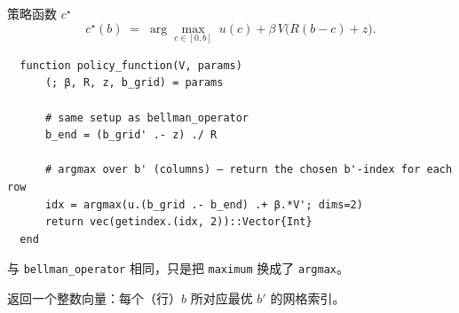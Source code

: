 \documentclass[10pt,aspectratio=169]{beamer}
\begin{document}
\begin{frame}[fragile]{策略函数 $c^\star$}
  \[
    c^\star(b) \;=\; \arg\max_{c \in [0, b]} \; u(c) + \beta \, V\!\big(R(b - c) + z\big).
  \]
  \begin{lstlisting}
  function policy_function(V, params)
      (; β, R, z, b_grid) = params

      # same setup as bellman_operator
      b_end = (b_grid' .- z) ./ R

      # argmax over b' (columns) — return the chosen b'-index for each row
      idx = argmax(u.(b_grid .- b_end) .+ β.*V'; dims=2)
      return vec(getindex.(idx, 2))::Vector{Int}
  end
  \end{lstlisting}
  与 \texttt{bellman\_operator} 相同，只是把 \texttt{maximum} 换成了 \texttt{argmax}。

  返回一个整数向量：每个（行）$b$ 所对应最优 $b'$ 的网格索引。
\end{frame}
\end{document}
